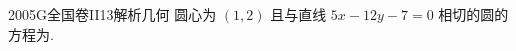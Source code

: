 
\begin{problem}{2005}{G}{全国卷II}{13}{解析几何}
圆心为 $(1,2)$ 且与直线 $5x -12y-7=0$ 相切的圆的方程为\underline{\hspace{4em}}.
\end{problem}

\begin{answer}

\end{answer}

\begin{solutions}

\end{solutions}